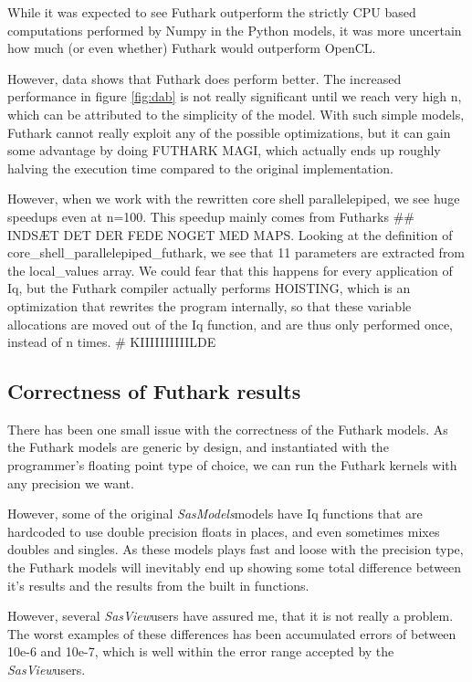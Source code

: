 \documentclass[11pt]{article}
\newcommand{\sasmodels}{\textit{SasModels}}
\newcommand{\sasview}{\textit{SasView}}
\begin{document}
  \begin{mdframed}[
    frametitle={Why does Futhark perform faster than OpenCL?},
    nobreak=true]
While it was expected to see Futhark outperform the strictly CPU based 
computations performed by Numpy in the Python models, it was more uncertain
how much (or even whether) Futhark would outperform OpenCL.

However, data shows that Futhark does perform better. The increased performance 
in figure \ref{fig:dab} is not really significant until we reach very high n,
which can be attributed to the simplicity of the model. With such simple models,
Futhark cannot really exploit any of the possible optimizations, but it can gain
some advantage by doing FUTHARK MAGI, which actually ends up roughly halving the 
execution time compared to the original implementation.

However, when we work with the rewritten core shell parallelepiped, we see huge
speedups even at n=100. This speedup mainly comes from Futharks ## INDSÆT DET 
DER FEDE NOGET MED MAPS.
Looking at the definition of core_shell_parallelepiped_futhark, we see that 11
parameters are extracted from the local\_values array. We could fear that this
happens for every application of Iq, but the Futhark compiler actually performs
HOISTING, which is an optimization that rewrites the program internally, so that
these variable allocations are moved out of the Iq function, and are thus only
performed once, instead of n times.
# KIIIIIIIIIILDE

\subsection{Correctness of Futhark results}
There has been one small issue with the correctness of the Futhark models.
As the Futhark models are generic by design, and instantiated with the 
programmer's floating point type of choice, we can run the Futhark kernels
with any precision we want.

However, some of the original \sasmodels models have Iq functions that are 
hardcoded to use double precision floats in places, and even sometimes mixes
doubles and singles. 
As these models plays fast and loose with the precision type, the Futhark models
will inevitably end up showing some total difference between it's results and 
the results from the built in functions.

However, several \sasview users have assured me, that it is not really a 
problem. The worst examples of these differences has been accumulated errors of
between 10e-6 and 10e-7, which is well within the error range accepted by 
the \sasview users.

\end{mdframed}
\end{document}
